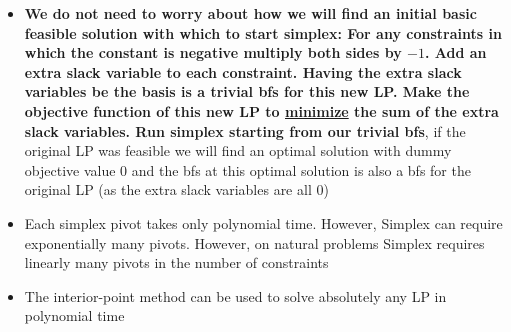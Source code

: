 \documentclass[20pt,a4paper,landscape]{extarticle}
\begin{document}
\begin{flushleft}
\begin{itemize}
\begin{lstlisting}[basicstyle=\ttfamily\bfseries,
    columns=fixed,
    numbers=left,
    breaklines=true,
    breakatwhitespace=true,
    breakindent=0pt]
    // Our requirement on $i$ guarantees that the new bfs will not strictly decrease the objective, and our requirement on $j$ guarantees that the new dictionary will be feasible
    Chose a basic variable $x_i$ with positive coefficient in the objective function to enter the basis and a variable $x_j$ to leave the basis such that the value of $x_i$ in a basic solution to the constraint which $x_j$ is current basic in is minimal.
    Rewrite the constraint with current basic variable $x_j$ to be in the form $x_i = \alpha$
    Substitute $\alpha$ for $x_i$ in all $\texttt{\underline{other}}$ constraints and the objective function
\end{lstlisting}
\clearpage
\item \textbf{We do not need to worry about how we will find an initial basic feasible solution with which to start simplex: For any constraints in which the constant is negative multiply both sides by $-1$. Add an extra slack variable to each constraint. Having the extra slack variables be the basis is a trivial bfs for this new LP. Make the objective function of this new LP to \underline{minimize} the sum of the extra slack variables. Run simplex starting from our trivial bfs}, if the original LP was feasible we will find an optimal solution with dummy objective value 0 and the bfs at this optimal solution is also a bfs for the original LP (as the extra slack variables are all 0)
\item Each simplex pivot takes only polynomial time. However, Simplex can require exponentially many pivots. However, on natural problems Simplex requires linearly many pivots in the number of constraints
\item The interior-point method can be used to solve absolutely any LP in polynomial time
\end{itemize}
\clearpage

\end{flushleft}
\end{document}
